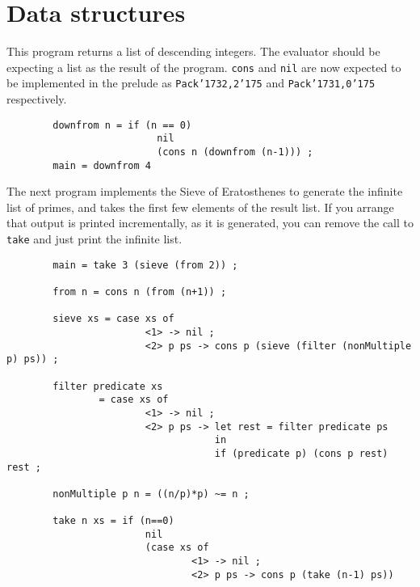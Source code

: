 \section{Data structures}

This program returns a list of descending integers.  The evaluator
should be expecting a list as the result of the program.
\mbox{\tt cons} and \mbox{\tt nil} are now expected to be implemented in the
prelude as \mbox{\tt Pack{\char'173}2,2{\char'175}} and \mbox{\tt Pack{\char'173}1,0{\char'175}} respectively.
\begin{verbatim}
        downfrom n = if (n == 0)
                          nil
                          (cons n (downfrom (n-1))) ;
        main = downfrom 4
\end{verbatim}

The next program implements the Sieve of Eratosthenes to generate the
infinite list of primes, and takes the first few elements of the result list.
If you arrange that output is printed incrementally, as it is generated, you
can remove the call to \mbox{\tt take} and just print the infinite list.
\begin{verbatim}
        main = take 3 (sieve (from 2)) ;

        from n = cons n (from (n+1)) ;

        sieve xs = case xs of
                        <1> -> nil ;
                        <2> p ps -> cons p (sieve (filter (nonMultiple p) ps)) ;

        filter predicate xs
                = case xs of
                        <1> -> nil ;
                        <2> p ps -> let rest = filter predicate ps
                                    in
                                    if (predicate p) (cons p rest) rest ;

        nonMultiple p n = ((n/p)*p) ~= n ;

        take n xs = if (n==0)
                        nil
                        (case xs of
                                <1> -> nil ;
                                <2> p ps -> cons p (take (n-1) ps))

\end{verbatim}
